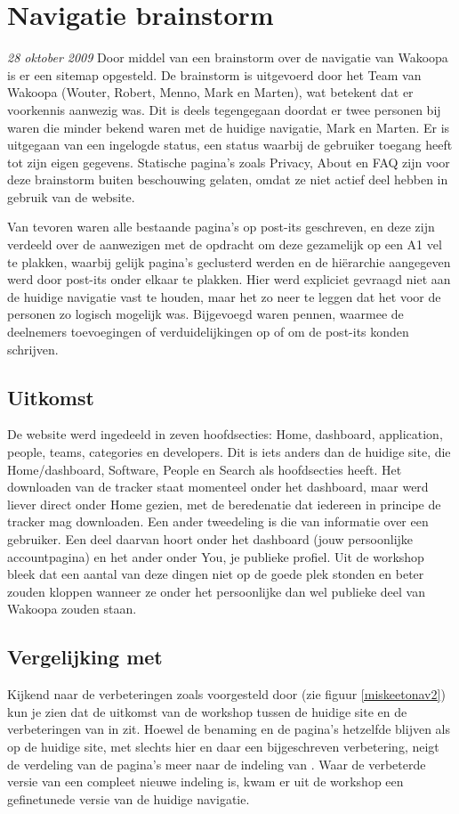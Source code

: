 \chapter{Navigatie brainstorm}
    \label{navigationappendix}
\textit{28 oktober 2009} Door middel van een brainstorm over de navigatie van Wakoopa is er een sitemap opgesteld. De brainstorm is uitgevoerd door het Team van Wakoopa (Wouter, Robert, Menno, Mark en Marten), wat betekent dat er voorkennis aanwezig was. Dit is deels tegengegaan doordat er twee personen bij waren die minder bekend waren met de huidige navigatie, Mark en Marten. Er is uitgegaan van een ingelogde status, een status waarbij de gebruiker toegang heeft tot zijn eigen gegevens. Statische pagina's zoals Privacy, About en FAQ zijn voor deze brainstorm buiten beschouwing gelaten, omdat ze niet actief deel hebben in gebruik van de website.

Van tevoren waren alle bestaande pagina's op post-its geschreven, en deze zijn verdeeld over de aanwezigen met de opdracht om deze gezamelijk op een A1 vel te plakken, waarbij gelijk pagina's geclusterd werden en de hi\"erarchie aangegeven werd door post-its onder elkaar te plakken. Hier werd expliciet gevraagd niet aan de huidige navigatie vast te houden, maar het zo neer te leggen dat het voor de personen zo logisch mogelijk was. Bijgevoegd waren pennen, waarmee de deelnemers toevoegingen of verduidelijkingen op of om de post-its konden schrijven.

\section*{Uitkomst}
De website werd ingedeeld in zeven hoofdsecties: Home, dashboard, application, people, teams, categories en developers. Dit is iets anders dan de huidige site, die Home/dashboard, Software, People en Search als hoofdsecties heeft. Het downloaden van de tracker staat momenteel onder het dashboard, maar werd liever direct onder Home gezien, met de beredenatie dat iedereen in principe de tracker mag downloaden. Een ander tweedeling is die van informatie over een gebruiker. Een deel daarvan hoort onder het dashboard (jouw persoonlijke accountpagina) en het ander onder You, je publieke profiel. Uit de workshop bleek dat een aantal van deze dingen niet op de goede plek stonden en beter zouden kloppen wanneer ze onder het persoonlijke dan wel publieke deel van Wakoopa zouden staan.
\section*{Vergelijking met \citeauthor{Hoekman2008}}
Kijkend naar de verbeteringen zoals voorgesteld door \citeauthor{Hoekman2008} (zie figuur \ref{miskeetonav2}) kun je zien dat de uitkomst van de workshop tussen de huidige site en de verbeteringen van \citeauthor{Hoekman2008} in zit. Hoewel de benaming en de pagina's hetzelfde blijven als op de huidige site, met slechts hier en daar een bijgeschreven verbetering, neigt de verdeling van de pagina's meer naar de indeling van \citeauthor{Hoekman2008}. Waar de verbeterde versie van \citeauthor{Hoekman2008} een compleet nieuwe indeling is, kwam er uit de workshop een gefinetunede versie van de huidige navigatie.

